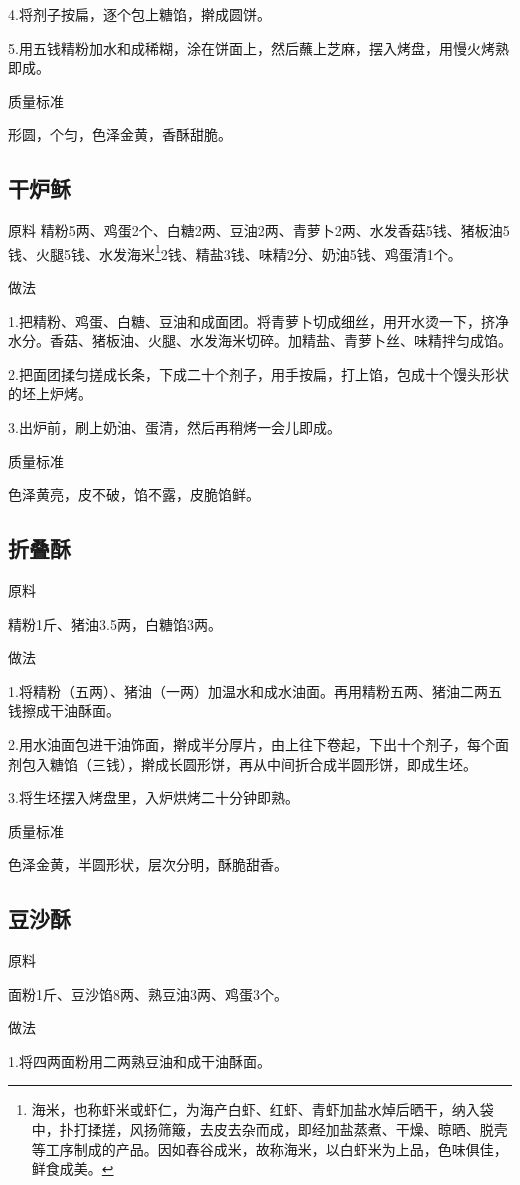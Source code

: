 \documentclass{ctexbook}
\begin{document}
4.将剂子按扁，逐个包上糖馅，擀成圆饼。

5.用五钱精粉加水和成稀糊，涂在饼面上，然后蘸上芝麻，摆入烤盘，用慢火烤熟即成。

质量标准

形圆，个匀，色泽金黄，香酥甜脆。
\subsection{干炉稣}
原料
精粉5两、鸡蛋2个、白糖2两、豆油2两、青萝卜2两、水发香菇5钱、猪板油5钱、火腿5钱、水发海米\footnote{海米，也称虾米或虾仁，为海产白虾、红虾、青虾加盐水焯后晒干，纳入袋中，扑打揉搓，风扬筛簸，去皮去杂而成，即经加盐蒸煮、干燥、晾晒、脱壳等工序制成的产品。因如舂谷成米，故称海米，以白虾米为上品，色味俱佳，鲜食成美。}2钱、精盐3钱、味精2分、奶油5钱、鸡蛋清1个。

做法

1.把精粉、鸡蛋、白糖、豆油和成面团。将青萝卜切成细丝，用开水烫一下，挤净水分。香菇、猪板油、火腿、水发海米切碎。加精盐、青萝卜丝、味精拌匀成馅。

2.把面团揉匀搓成长条，下成二十个剂子，用手按扁，打上馅，包成十个馒头形状的坯上炉烤。

3.出炉前，刷上奶油、蛋清，然后再稍烤一会儿即成。

质量标准

色泽黄亮，皮不破，馅不露，皮脆馅鲜。
\subsection{折叠酥}
原料

精粉1斤、猪油3.5两，白糖馅3两。

做法

1.将精粉（五两）、猪油（一两）加温水和成水油面。再用精粉五两、猪油二两五钱擦成干油酥面。

2.用水油面包进干油饰面，擀成半分厚片，由上往下卷起，下出十个剂子，每个面剂包入糖馅（三钱），擀成长圆形饼，再从中间折合成半圆形饼，即成生坯。

3.将生坯摆入烤盘里，入炉烘烤二十分钟即熟。

质量标准

色泽金黄，半圆形状，层次分明，酥脆甜香。
\subsection{豆沙酥}
原料

面粉1斤、豆沙馅8两、熟豆油3两、鸡蛋3个。

做法

1.将四两面粉用二两熟豆油和成干油酥面。
\end{document}

